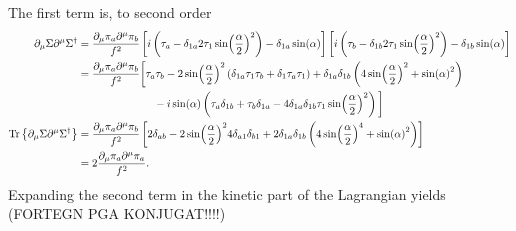 \documentclass{article}
\begin{document}
The first term is, to second order
\begin{align*}
    \partial_\mu \Sigma \partial^\mu \Sigma^\dagger 
    & = \frac{\partial_\mu \pi_a \partial^\mu \pi_b}{f^2}
    \left[
        i\left(\tau_a - \delta_{1a} 2 \tau_1 \sin(\frac{\alpha}{2})^2 \right)
        - \delta_{1a}\sin(\alpha)
    \right]
    \left[
        i\left(\tau_b - \delta_{1b} 2 \tau_1 \sin(\frac{\alpha}{2})^2 \right)
        - \delta_{1b}\sin(\alpha)
    \right] \\
    & = \frac{\partial_\mu\pi_a \partial^\mu \pi_b}{f^2}
    \bigg[
        \tau_a\tau_b
        - 2 \sin(\frac{\alpha}{2})^2 
        \left(\delta_{1a}\tau_1 \tau_b + \delta_{1}\tau_a \tau_1\right)
            + \delta_{1a}\delta_{1b} \left(4 \sin(\frac{\alpha}{2})^2 + \sin(\alpha)^2 
        \right) \\
        &\phantom{=\frac{1}{f^2} \partial_\mu\pi_a \partial^\mu \pi_b \bigg[}
        - i \sin(\alpha)
        \left(
            \tau_a \delta_{1 b} + \tau_b \delta_{1 a} 
            - 4 \delta_{1 a}\delta_{1 b} \tau_1 \sin(\frac{\alpha}{2})^2
        \right)
    \bigg]\\
    \Tr\C{\partial_\mu \Sigma \partial^\mu \Sigma^\dagger}
    & = \frac{ \partial_\mu\pi_a \partial^\mu \pi_b}{f^2}
    \left[
        2 \delta_{ab}- 2 \sin(\frac{\alpha}{2})^2 4 \delta_{a1}\delta_{b1}
        + 2 \delta_{1a}\delta_{1b}
        \left(4 \sin(\frac{\alpha}{2})^4 + \sin(\alpha)^2 \right)
    \right] \\
    & = 2 \frac{\partial_\mu \pi_a \partial^\mu \pi_a}{f^2}.
\end{align*}
Expanding the second term in the kinetic part of the Lagrangian yields (FORTEGN PGA KONJUGAT!!!!)
\end{document}
